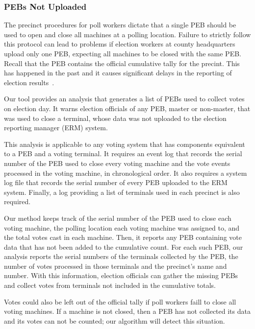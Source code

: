 \subsubsection{PEBs Not Uploaded}
\label{sec:pebs_not_uploaded}
The precinct procedures for poll workers dictate that a single PEB
should be used to open and close all machines at a polling
location. Failure to strictly follow this protocol can lead to problems if
election workers at county headquarters upload only one PEB, expecting all
machines to be closed with the same PEB. Recall that the PEB contains the
official cumulative tally for the precint. This has happened in the past and it 
causes significant delays in the reporting of election
results~\cite{Buell2011,Mazella2002}. 

Our
tool provides an analysis that generates a list of PEBs used to collect
votes on election day. It warns election officials of any PEB, master
or non-master, that was used to close a terminal, whose data was not
uploaded to the election reporting manager (ERM) system.  

This analysis is applicable to any voting system that has components
equivalent to a PEB and a voting terminal.  It requires an event log
that records the serial number of the PEB used to close every voting
machine and the vote events processed in the voting machine, in
chronological order. It also requires a system log file that records the
serial number of every PEB uploaded to the ERM 
system. Finally, a log providing a list of terminals used in each
precinct is also required.

Our method keeps track of the serial number of the PEB used to close each voting
machine, the polling location each voting machine was assigned
to, and the total votes cast in each machine. Then, it
reports any PEB containing vote data that has not been added to the cumulative
count.  For each such PEB, our analysis reports the serial numbers of the
terminals collected by the PEB, the number of votes processed in those terminals
and the precinct's name and number. With this information, election officials
can gather the missing PEBs and collect votes from terminals not included in the
cumulative totals.

Votes could also be left out of the official tally if poll workers faill to close
all voting machines. If a machine is not closed, then a PEB has
not collected its data and its votes can not be counted; our algorithm
will  detect this situation.   

